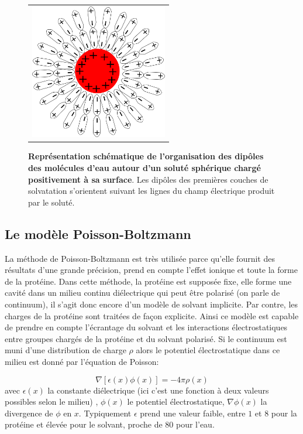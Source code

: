    \begin{figure}[!htbp]
     \centering
     \begin{tabular}{c}
       \includegraphics[width=6cm]{figure/ecrantage.png} &
     \end{tabular}
     
     \caption{\textbf{Représentation schématique de l'organisation des dipôles des molécules d'eau autour d'un soluté sphérique chargé positivement à sa surface}. Les dipôles des premières couches de solvatation s'orientent suivant les lignes du champ électrique produit par le soluté.}
\label{graph:ecrantage}
   \end{figure}
   
\subsection{Le modèle Poisson-Boltzmann}
La méthode de Poisson-Boltzmann est très utilisée parce qu'elle fournit des résultats d'une grande précision, prend en compte l'effet ionique et toute la forme de la protéine. Dans cette méthode, la protéine est supposée fixe, elle forme une cavité dans un milieu continu diélectrique qui peut être polarisé (on parle de continuum), il s'agit donc encore d'un modèle de solvant implicite. Par contre, les charges de la protéine sont traitées de façon explicite. Ainsi ce modèle est capable de prendre en compte l'écrantage du solvant et les interactions électrostatiques entre groupes chargés de la protéine et du solvant polarisé. Si le continuum est muni d'une distribution de charge $\rho$ alors le potentiel électrostatique dans ce milieu est donné par l'équation de Poisson:

\begin{equation}
  \label{eq:poisson}
  \nabla [ \epsilon(x) \phi(x)] = - 4 \pi \rho(x)   
\end{equation}
avec $\epsilon(x)$ la constante diélectrique (ici c'est une fonction à deux valeurs possibles selon le milieu) , $\phi (x)$ le potentiel électrostatique, $\nabla \phi(x)$ la divergence de $\phi$ en $x$.
Typiquement $\epsilon$ prend une valeur faible, entre $1$ et $8$ pour la protéine et élevée pour le solvant, proche de $80$ pour l'eau.

